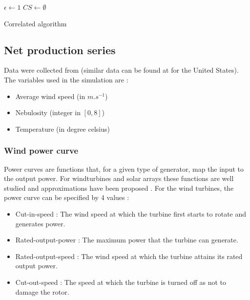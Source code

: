 \documentclass[conference]{IEEEtran}
\begin{document}
\begin{algorithm}
 $ \epsilon \leftarrow 1 $ \;
 $ CS \leftarrow \emptyset $\;
 \caption{Correlated algorithm}
\label{alg:algo3}
\end{algorithm}


\subsection{Net production series}

Data were collected from \cite{Infoclimat} (similar data can be found at \cite{NCDC} for the United States). The variables used in the simulation are :

\begin{itemize}
\item Average wind speed (in $m.s^{-1}$)
\item Nebulosity (integer in $[0,8] $)
\item Temperature (in degree celsius)
\end{itemize} 

\subsubsection{Wind power curve}
Power curves are functions that, for a given type of generator, map the input to the output power. For windturbines and solar arrays these functions are well studied and approximations have been proposed \cite{Lydia2014} \cite{Dans2007}. For the wind turbines, the power curve can be specified by 4 values :

\begin{itemize}
\item Cut-in-speed : The wind speed at which the turbine first starts to rotate and generates power.
\item Rated-output-power : The maximum power that the turbine can generate.
\item Rated-output-speed : The wind speed at which the turbine attains its rated output power.
\item Cut-out-speed : The speed at which the turbine is turned off as not to damage the rotor.
\end{itemize}
\end{document}
